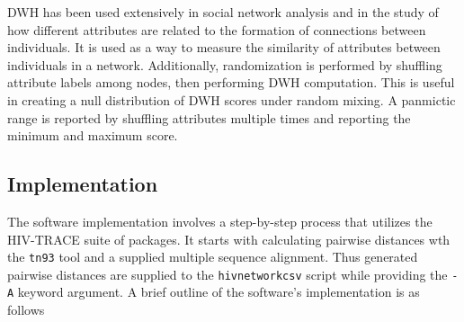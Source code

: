 \documentclass[utf8]{FrontiersinHarvard} %
\begin{document}
DWH has been used extensively in social network analysis and in the study of how different
attributes are related to the formation of connections between individuals. It
is used as a way to measure the similarity of attributes between individuals in
a network. Additionally, randomization is performed by shuffling attribute labels among nodes, then performing DWH computation. 
This is useful in creating a null distribution of DWH scores under random
mixing. A panmictic range is reported by shuffling attributes multiple times and
reporting the minimum and maximum score.

\subsection{Implementation}

The software implementation involves a step-by-step process that utilizes the HIV-TRACE suite of packages. It starts with calculating pairwise distances wth the {\tt tn93} tool and a supplied multiple sequence alignment. 
Thus generated pairwise distances are supplied to the {\tt hivnetworkcsv} script while providing the {\tt -A} keyword argument. A brief outline of the software's implementation is as follows
\end{document}
